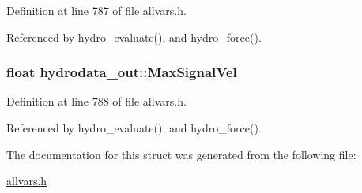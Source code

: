Definition at line 787 of file allvars.h.



Referenced by hydro\_\-evaluate(), and hydro\_\-force().

\hypertarget{structhydrodata__out_a6f4c65630e80c636a128d59e0afc4dad}{
\subsubsection[{MaxSignalVel}]{\setlength{\rightskip}{0pt plus 5cm}float {\bf hydrodata\_\-out::MaxSignalVel}}}
\label{structhydrodata__out_a6f4c65630e80c636a128d59e0afc4dad}


Definition at line 788 of file allvars.h.



Referenced by hydro\_\-evaluate(), and hydro\_\-force().



The documentation for this struct was generated from the following file:\begin{DoxyCompactItemize}
\item 
\hyperlink{allvars_8h}{allvars.h}\end{DoxyCompactItemize}
